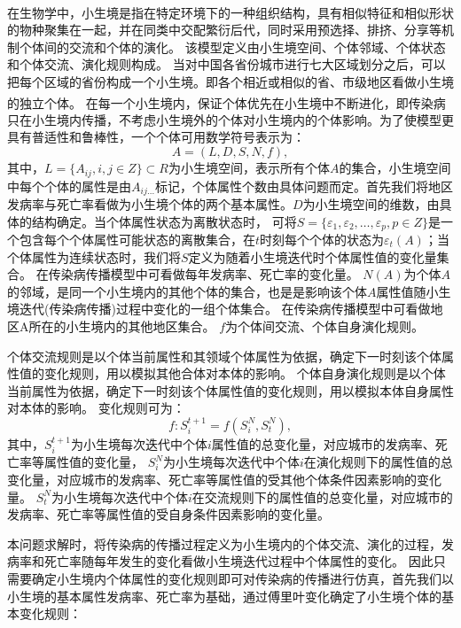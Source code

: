 \documentclass{whutmod}
\begin{document}
在生物学中，小生境是指在特定环境下的一种组织结构\textsuperscript{\cite{bib:nine}}，具有相似特征和相似形状的物种聚集在一起，并在同类中交配繁衍后代，同时采用预选择、排挤、分享等机制个体间的交流和个体的演化。
该模型定义由小生境空间、个体邻域、个体状态和个体交流、演化规则构成。
当对中国各省份城市进行七大区域划分之后，可以把每个区域的省份构成一个小生境。即各个相近或相似的省、市级地区看做小生境的独立个体。
在每一个小生境内，保证个体优先在小生境中不断进化\textsuperscript{\cite{bib:ten}}，即传染病只在小生境内传播，不考虑小生境外的个体对小生境内的个体影响。为了使模型更具有普适性和鲁棒性，一个个体可用数学符号表示为：
\begin{equation}
    A=(L,D,S,N,f),
\end{equation}
其中，$L=\{A_{ij},i,j\in Z\}\subset R$为小生境空间，表示所有个体$A$的集合，小生境空间中每个个体的属性是由$A_{ij...}$标记，个体属性个数由具体问题而定。首先我们将地区发病率与死亡率看做为小生境个体的两个基本属性。$D$为小生境空间的维数，由具体的结构确定。当个体属性状态为离散状态时，
可将$S=\{\varepsilon_1,\varepsilon_2,\dots,\varepsilon_p,p\in Z\}$是一个包含每个个体属性可能状态的离散集合，在$t$时刻每个个体的状态为$\varepsilon_t(A)$；当个体属性为连续状态时，我们将$S$定义为随着小生境迭代时个体属性值的变化量集合。
在传染病传播模型中可看做每年发病率、死亡率的变化量。
$N(A)$为个体$A$的邻域，是同一个小生境内的其他个体的集合，也是是影响该个体$A$属性值随小生境迭代(传染病传播)过程中变化的一组个体集合。
在传染病传播模型中可看做地区A所在的小生境内的其他地区集合。
$f$为个体间交流、个体自身演化规则。

个体交流规则是以个体当前属性和其领域个体属性为依据，确定下一时刻该个体属性值的变化规则，用以模拟其他合体对本体的影响。
个体自身演化规则是以个体当前属性为依据，确定下一时刻该个体属性值的变化规则，用以模拟本体自身属性对本体的影响。
变化规则可为：
\begin{equation}
f:S_i^{t+1}=f(S_i^N,S_t^N),
\end{equation}
其中，$S_i^{t+1}$为小生境每次迭代中个体$i$属性值的总变化量，对应城市的发病率、死亡率等属性值的变化量，
$S_i^N$为小生境每次迭代中个体$i$在演化规则下的属性值的总变化量，对应城市的发病率、死亡率等属性值的受其他个体条件因素影响的变化量。
$S_t^N$为小生境每次迭代中个体$i$在交流规则下的属性值的总变化量，对应城市的发病率、死亡率等属性值的受自身条件因素影响的变化量。

本问题求解时，将传染病的传播过程定义为小生境内的个体交流、演化的过程，发病率和死亡率随每年发生的变化看做小生境迭代过程中个体属性的变化。
因此只需要确定小生境内个体属性的变化规则即可对传染病的传播进行仿真，首先我们以小生境的基本属性发病率、死亡率为基础，通过傅里叶变化确定了小生境个体的基本变化规则：
\end{document}
